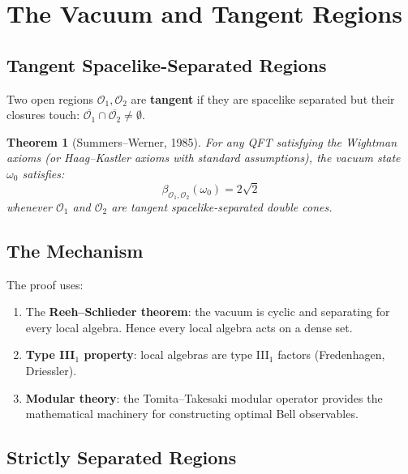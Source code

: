 \documentclass[11pt,a4paper]{article}
\newtheorem{theorem}{Theorem}[section]
\begin{document}
\section{The Vacuum and Tangent Regions}

\subsection{Tangent Spacelike-Separated Regions}

Two open regions $\mathcal{O}_1, \mathcal{O}_2$ are \textbf{tangent}
if they are spacelike separated but their closures touch:
$\overline{\mathcal{O}_1} \cap \overline{\mathcal{O}_2} \neq \emptyset$.

\begin{theorem}[Summers--Werner, 1985]
For any QFT satisfying the Wightman axioms (or Haag--Kastler axioms with
standard assumptions), the vacuum state $\omega_0$ satisfies:
\begin{equation}
  \beta_{\mathcal{O}_1, \mathcal{O}_2}(\omega_0) = 2\sqrt{2}
\end{equation}
whenever $\mathcal{O}_1$ and $\mathcal{O}_2$ are tangent spacelike-separated
double cones.
\end{theorem}

\subsection{The Mechanism}

The proof uses:
\begin{enumerate}[nosep]
  \item The \textbf{Reeh--Schlieder theorem}: the vacuum is cyclic and
        separating for every local algebra. Hence every local algebra
        acts on a dense set.
  \item \textbf{Type III$_1$ property}: local algebras are type III$_1$
        factors (Fredenhagen, Driessler).
  \item \textbf{Modular theory}: the Tomita--Takesaki modular operator
        provides the mathematical machinery for constructing optimal
        Bell observables.
\end{enumerate}

\subsection{Strictly Separated Regions}
\end{document}
